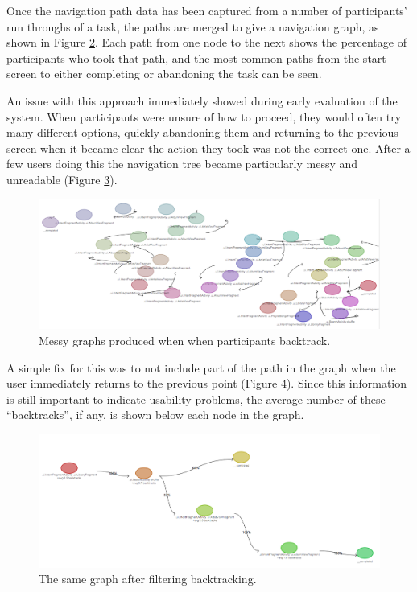 \begin{figure}
 \label{fig:task-navigation}
\end{figure}

Once the navigation path data has been captured from a number of participants' run throughs of a
task, the paths are merged to give a navigation graph, as shown in Figure \ref{fig:task-navigation-tree}. Each path from one node to the next shows the percentage of participants who took that path, and the most
common paths from the start screen to either completing or abandoning the task can be seen.

\begin{figure}
 \label{fig:task-navigation-tree}
\end{figure}

An issue with this approach immediately showed during early evaluation of the system. When participants were unsure of how to proceed, they would often try many different options, quickly abandoning them and returning to the previous screen when it became clear the action they took was not the correct one.
After a few users doing this the navigation tree became particularly messy and unreadable 
(Figure \ref{fig:task-navigation-mess}).

\begin{figure}
 \includegraphics[width=\textwidth]{images/messy-graph}
 \caption{Messy graphs produced when when participants backtrack.}
 \label{fig:task-navigation-mess}
\end{figure}

A simple fix for this was to not include part of the path in the graph when the user immediately returns
to the previous point (Figure \ref{fig:task-navigation-mess-fixed}). Since this information is still important to indicate usability problems, the average number of these ``backtracks'', if any, is shown below each node in the graph.

\begin{figure}
 \includegraphics[width=\textwidth]{images/fixed-graph}
 \caption{The same graph after filtering backtracking.}
 \label{fig:task-navigation-mess-fixed}
\end{figure}